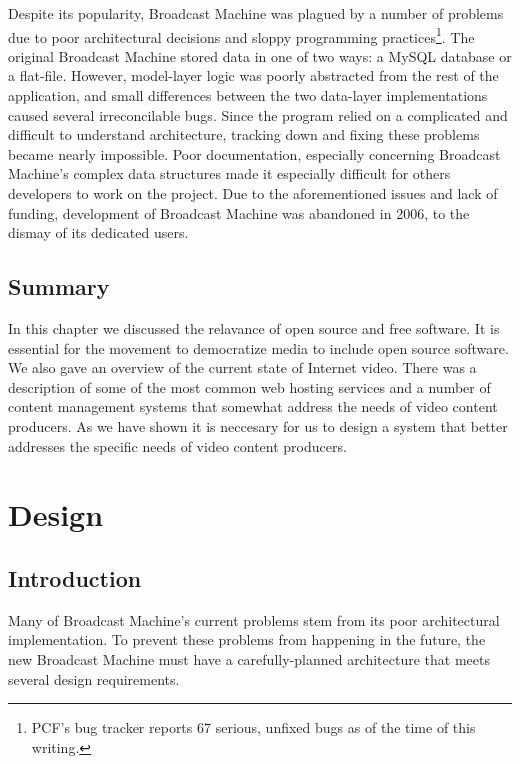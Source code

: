 \documentclass[a4paper,12pt]{report}
\begin{document}
Despite its popularity, Broadcast Machine was plagued by a number of problems due to poor architectural decisions and sloppy programming practices\footnote{PCF's bug tracker reports 67 serious, unfixed bugs as of the time of this writing.}. The original Broadcast Machine stored data in one of two ways: a MySQL database or a flat-file. However, model-layer logic was poorly abstracted from the rest of the application, and small differences between the two data-layer implementations caused several irreconcilable bugs. Since the program relied on a complicated and difficult to understand architecture, tracking down and fixing these problems became nearly impossible. Poor documentation, especially concerning Broadcast Machine's complex data structures made it especially difficult for others developers to work on the project. Due to the aforementioned issues and lack of funding, development of Broadcast Machine was abandoned in 2006, to the dismay of its dedicated users.

\section{Summary}
In this chapter we discussed the relavance of open source and free software. It is essential for the movement to democratize
media to include open source software. We also gave an overview of the current state of Internet video. There was a description of some
of the most common web hosting services and a number of content management systems that somewhat address the needs of video content
producers. As we have shown it is neccesary for us to design a system that better addresses the specific needs of video content producers.

\chapter{Design}

\section{Introduction}
Many of Broadcast Machine's current problems stem from its poor architectural implementation. 
To prevent these problems from happening in the future, the new Broadcast Machine must have a carefully-planned architecture that meets several design requirements.
\end{document}
